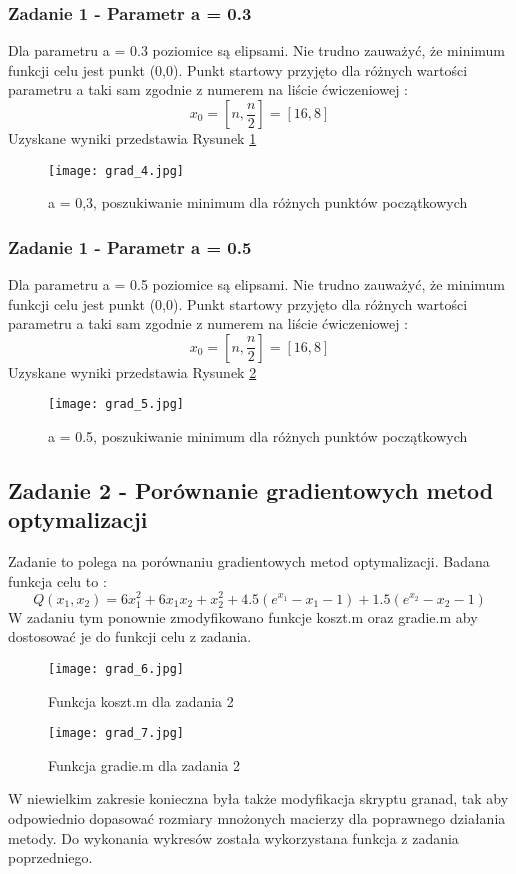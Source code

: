 \documentclass[a4paper,15pt]{article}
\begin{document}
\subsubsection{Zadanie 1 - Parametr a = 0.3}
Dla parametru a = 0.3 poziomice są elipsami. Nie trudno zauważyć, że minimum funkcji celu jest punkt (0,0). Punkt startowy przyjęto dla różnych wartości parametru a taki sam zgodnie z numerem na liście ćwiczeniowej : 
\begin{equation*}
x_{0}=\left[n,\frac{n}{2}\right]=\left[16,8\right]
\end{equation*}
Uzyskane wyniki przedstawia Rysunek \ref{fig:grad_4}
\begin{figure}[H]
\centerline{\texttt{[image: grad\_4.jpg]}}
\centering
\caption{a = 0,3, poszukiwanie minimum dla różnych punktów początkowych}
\label{fig:grad_4}
\end{figure}

\subsubsection{Zadanie 1 - Parametr a = 0.5}
Dla parametru a = 0.5 poziomice są elipsami. Nie trudno zauważyć, że minimum funkcji celu jest punkt (0,0). Punkt startowy przyjęto dla różnych wartości parametru a taki sam zgodnie z numerem na liście ćwiczeniowej : 
\begin{equation*}
x_{0}=\left[n,\frac{n}{2}\right]=\left[16,8\right]
\end{equation*}
Uzyskane wyniki przedstawia Rysunek \ref{fig:grad_5}
\begin{figure}[H]
\centerline{\texttt{[image: grad\_5.jpg]}}
\centering
\caption{a = 0.5, poszukiwanie minimum dla różnych punktów początkowych}
\label{fig:grad_5}
\end{figure}

\subsection{Zadanie 2 - Porównanie gradientowych metod optymalizacji}
Zadanie to polega na porównaniu gradientowych metod optymalizacji. Badana funkcja celu to :
\begin{equation*}
Q(x_{1},x_{2})=6x_{1}^{2}+6x_{1}x_{2}+x_{2}^{2}+4.5(e^{x_{1}}-x_{1}-1)+1.5(e^{x_{2}}-x_{2}-1)
\end{equation*}
W zadaniu tym ponownie zmodyfikowano funkcje koszt.m oraz gradie.m aby dostosować je do funkcji celu z zadania.
\begin{figure}[H]
\centerline{\texttt{[image: grad\_6.jpg]}}
\centering
\caption{Funkcja koszt.m dla zadania 2}
\label{fig:grad_6}
\end{figure}
\begin{figure}[H]
\centerline{\texttt{[image: grad\_7.jpg]}}
\centering
\caption{Funkcja gradie.m dla zadania 2}
\label{fig:grad_7}
\end{figure}
W niewielkim zakresie konieczna była także modyfikacja skryptu granad, tak aby odpowiednio dopasować rozmiary mnożonych macierzy dla poprawnego działania metody. Do wykonania wykresów została wykorzystana funkcja z zadania poprzedniego.
\end{document}
